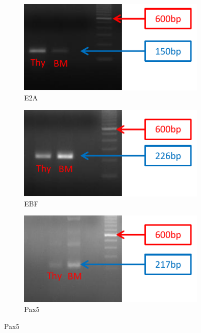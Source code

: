 \begin{figure}
	\begin{subfigure}{0.5\textwidth}
	\centering
	\includegraphics[width=\textwidth]{Figures/E2A.pdf}
	\caption{E2A}
	\end{subfigure}
	\begin{subfigure}{0.5\textwidth}
	\centering
	\includegraphics[width=\textwidth]{Figures/EBF.pdf}
	\caption{EBF}
	\end{subfigure}
	\begin{subfigure}{0.5\textwidth}
	\centering
	\includegraphics[width=\textwidth]{Figures/sPax5.pdf}
	\caption{Pax5}
	\end{subfigure}

\end{figure}
